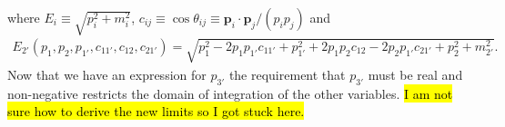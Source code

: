 where $E_i \equiv \sqrt{p_i^2 + m_i^2}$, $c_{ij} \equiv \cos \theta_{ij} \equiv \bm{p}_i \cdot \bm{p}_j / (p_i p_j)$ and 
\begin{align}
    E_{2'}(p_1, p_{2}, p_{1'}, c_{11'}, c_{12}, c_{21'}) = \sqrt{p_1^2  - 2 p_1 p_{1'} c_{11'} + p_{1'}^2  + 2 p_{1} p_{2} c_{12} - 2 p_2 p_{1'} c_{21'} + p_2^2 + m_{2'}^2}.    
\end{align}
Now that we have an expression for $p_{3'}$ the requirement that $p_{3'}$ must be real and non-negative restricts the domain of integration of the other variables. 
\hl{I am not sure how to derive the new limits so I got stuck here.}


